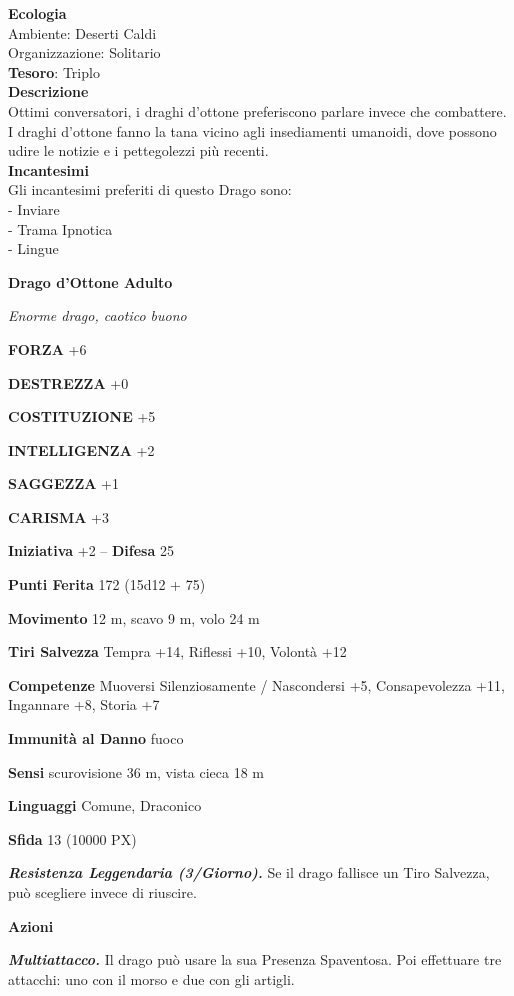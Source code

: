 \begin{multicols}{2}
\textbf{Ecologia}\\
Ambiente: Deserti Caldi\\
Organizzazione: Solitario\\
\textbf{Tesoro}: Triplo\\
\textbf{Descrizione}\\
Ottimi conversatori, i draghi d'ottone preferiscono parlare invece che combattere. I draghi d'ottone fanno la tana vicino agli insediamenti umanoidi, dove possono udire le notizie e i pettegolezzi più recenti.\\
\textbf{Incantesimi}\\
Gli incantesimi preferiti di questo Drago sono:\\
- Inviare\\
- Trama Ipnotica\\
- Lingue


\medskip{}\textbf{Drago d'Ottone Adulto}

\textit{Enorme drago, caotico buono}

\textbf{FORZA} +6

\textbf{DESTREZZA} +0

\textbf{COSTITUZIONE} +5

\textbf{INTELLIGENZA} +2

\textbf{SAGGEZZA} +1

\textbf{CARISMA} +3

\textbf{Iniziativa} +2 -- \textbf{Difesa} 25

\textbf{Punti Ferita} 172 (15d12 + 75)

\textbf{Movimento} 12 m, scavo 9 m, volo 24 m

\textbf{Tiri Salvezza} Tempra +14, Riflessi +10, Volontà +12

\textbf{Competenze} Muoversi Silenziosamente / Nascondersi +5, Consapevolezza +11, Ingannare +8, Storia +7

\textbf{Immunità al Danno} fuoco

\textbf{Sensi} scurovisione 36 m, vista cieca 18 m

\textbf{Linguaggi} Comune, Draconico

\textbf{Sfida} 13 (10000 PX)

\textit{\textbf{Resistenza Leggendaria (3/Giorno).}} Se il drago fallisce un Tiro Salvezza, può scegliere invece di riuscire.

\textbf{Azioni}

\textit{\textbf{Multiattacco.}} Il drago può usare la sua Presenza Spaventosa. Poi effettuare tre attacchi: uno con il morso e due con gli artigli.


\end{multicols}
